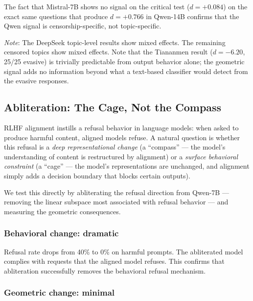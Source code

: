\documentclass[11pt,a4paper]{article}
\begin{document}
The fact that Mistral-7B shows no signal on the critical test ($d = +0.084$) on the exact same questions that produce $d = +0.766$ in Qwen-14B confirms that the Qwen signal is censorship-specific, not topic-specific.

\emph{Note}: The DeepSeek topic-level results show mixed effects. The remaining censored topics show mixed effects. Note that the Tiananmen result ($d = -6.20$, 25/25 evasive) is trivially predictable from output behavior alone; the geometric signal adds no information beyond what a text-based classifier would detect from the evasive responses.

\subsection{Abliteration: The Cage, Not the Compass}
\label{sec:abliteration}

RLHF alignment instills a refusal behavior in language models: when asked to produce harmful content, aligned models refuse. A natural question is whether this refusal is a \emph{deep representational change} (a ``compass'' --- the model's understanding of content is restructured by alignment) or a \emph{surface behavioral constraint} (a ``cage'' --- the model's representations are unchanged, and alignment simply adds a decision boundary that blocks certain outputs).

We test this directly by abliterating \citep{arditi2024refusal,heretic2026} the refusal direction from Qwen-7B --- removing the linear subspace most associated with refusal behavior --- and measuring the geometric consequences.

\subsubsection{Behavioral change: dramatic}

Refusal rate drops from 40\% to 0\% on harmful prompts. The abliterated model complies with requests that the aligned model refuses. This confirms that abliteration successfully removes the behavioral refusal mechanism.

\subsubsection{Geometric change: minimal}
\end{document}
